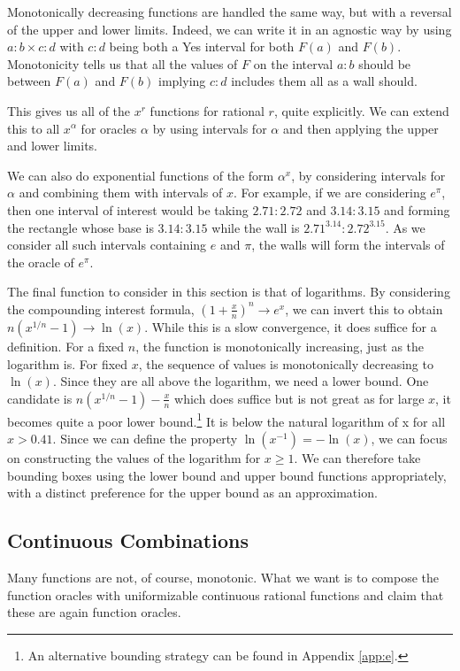 \documentclass[12pt]{article}
\theoremstyle{remark}
\begin{document}
Monotonically decreasing functions are handled the same way, but with a reversal of the upper and lower limits. Indeed, we can write it in an agnostic way by using $a:b \times c:d$ with $c:d$ being both a Yes interval for both $F(a)$ and $F(b)$. Monotonicity tells us that all the values of $F$ on the interval $a:b$ should be between $F(a)$ and $F(b)$ implying $c:d$ includes them all as a wall should. 

This gives us all of the $x^r$ functions for rational $r$, quite explicitly. We can extend this to all $x^{\alpha}$ for oracles $\alpha$ by using intervals for $\alpha$ and then applying the upper and lower limits. 

We can also do exponential functions of the form $\alpha^{x}$, by considering intervals for $\alpha$ and combining them with intervals of $x$. For example, if we are considering $e^{\pi}$, then one interval of interest would be taking $2.71:2.72$ and $3.14:3.15$ and forming the rectangle whose base is $3.14:3.15$ while the wall is $2.71^{3.14}:2.72^{3.15}$. As we consider all such intervals containing $e$ and $\pi$, the walls will form the intervals of the oracle of $e^{\pi}$.

The final function to consider in this section is that of logarithms. By considering the compounding interest formula, $(1+ \frac{x}{n})^n \to e^x$, we can invert this to obtain $n (x^{1/n} - 1) \to \ln(x)$. While this is a slow convergence, it does suffice for a definition. For a fixed $n$, the function is monotonically increasing, just as the logarithm is. For fixed $x$, the sequence of values is monotonically decreasing to $\ln(x)$. Since they are all above the logarithm, we need a lower bound. One candidate is  $n (x^{1/n} - 1) - \frac{x}{n} $ which does suffice but is not great as for large $x$, it becomes quite a poor lower bound.\footnote{An alternative bounding strategy can be found in Appendix \ref{app:e}.} It is below the natural logarithm of x for all $x > 0.41$. Since we can define the property $\ln(x^{-1}) = - \ln(x)$, we can focus on constructing the values of the logarithm for $x\geq 1$. We can therefore take bounding boxes using the lower bound and upper bound functions appropriately, with a distinct preference for the upper bound as an approximation.  


\subsection{Continuous Combinations}

Many functions are not, of course, monotonic. What we want is to compose the function oracles with uniformizable continuous rational functions and claim that these are again function oracles. 
\end{document}
